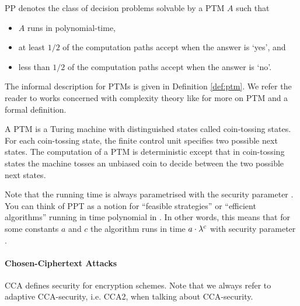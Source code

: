 \begin{definition}[\acl{PP}]\label{def:ppt}
\ac{PP} denotes the class of decision problems solvable by a \ac{PTM} $A$ such that
\begin{itemize}
	\item $A$ runs in polynomial-time,
	\item at least $1/2$ of the computation paths accept when the answer is `yes', and
	\item less than $1/2$ of the computation paths accept when the answer is `no'. \eod
\end{itemize}
\end{definition}

\noindent
The informal description for \aclp{PTM} is given in Definition \ref{def:ptm}.
We refer the reader to works concerned with complexity theory like \cite{santos1969,WaterlooComplexity} for more on \ac{PTM} and a formal definition.

\begin{definition}\label{def:ptm}
A \ac{PTM} is a Turing machine with distinguished states called coin-tossing states.
For each coin-tossing state, the finite control unit specifies two possible next states.
The computation of a \ac{PTM} is deterministic except that in coin-tossing states the machine tosses an unbiased coin to decide between the two possible next states.
\end{definition}

\noindent
Note that the running time is always parametrised with the security parameter \secpar.
You can think of \ac{PPT} as a notion for ``feasible strategies'' or ``efficient algorithms'' running in time polynomial in \secpar.
In other words, this means that for some constants $a$ and $c$ the algorithm runs in time $a\cdot \lambda^c$ with security parameter \secpar \cite{katz2008introduction}.

\paragraph{Chosen-Ciphertext Attacks}
\ac{CCA} defines security for encryption schemes.
Note that we always refer to adaptive \ac{CCA}-security, i.e. \ac{CCA}2, when talking about \ac{CCA}-security.


